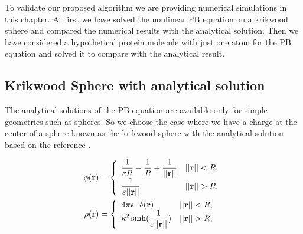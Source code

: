 To validate our proposed algorithm we are providing numerical simulations in this chapter. At first we have solved the nonlinear PB equation on a krikwood sphere and compared the numerical results with the analytical solution. Then we have considered a hypothetical protein molecule with just one atom for the PB equation and solved it to compare with the analytical result. 


\subsection{Krikwood Sphere with analytical solution}
\label{krik}

The analytical solutions of the PB equation are available only for simple geometries such as spheres. So we choose the case where we have a charge at the center of a sphere known as the krikwood sphere  with the analytical solution based on the reference \cite{Geng2013_Fully}. 



\begin{align}\label{Eq_sphere1}
   	\phi({\bf r})&=\left\{\begin{array}{lc}\displaystyle\frac{1}{\varepsilon R}-\frac{1}{R}+\displaystyle\frac{1}{||{\bf r}||} & ||{\bf r}||<R, \\
	\displaystyle\frac{1}{\varepsilon ||{\bf r}||}& ||{\bf r}||>R.\end{array}\right.\\\label{Eq_sphere2}
	  	\rho({\bf r})&=\left\{\begin{array}{lc}4\pi \epsilon^-\delta ({\bf r)} & ||{\bf r}||<R, \\ \displaystyle\bar{\kappa}^2\sinh (\frac{1}{\varepsilon ||{\bf r}||}) & ||{\bf r}||>R,\end{array}\right.
\end{align}


